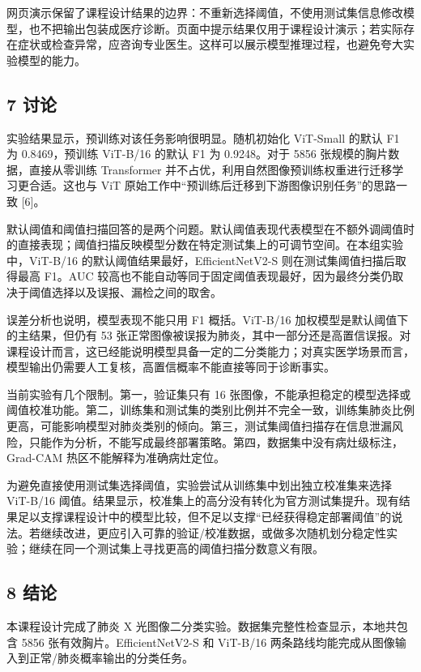 \documentclass[
]{ctexart}
\begin{document}
网页演示保留了课程设计结果的边界：不重新选择阈值，不使用测试集信息修改模型，也不把输出包装成医疗诊断。页面中提示结果仅用于课程设计演示；若实际存在症状或检查异常，应咨询专业医生。这样可以展示模型推理过程，也避免夸大实验模型的能力。

\hypertarget{ux8ba8ux8bba}{%
\subsection{7 讨论}\label{ux8ba8ux8bba}}

实验结果显示，预训练对该任务影响很明显。随机初始化 ViT-Small 的默认 F1
为 0.8469，预训练 ViT-B/16 的默认 F1 为 0.9248。对于 5856
张规模的胸片数据，直接从零训练 Transformer
并不占优，利用自然图像预训练权重进行迁移学习更合适。这也与 ViT
原始工作中``预训练后迁移到下游图像识别任务''的思路一致 {[}6{]}。

默认阈值和阈值扫描回答的是两个问题。默认阈值表现代表模型在不额外调阈值时的直接表现；阈值扫描反映模型分数在特定测试集上的可调节空间。在本组实验中，ViT-B/16
的默认阈值结果最好，EfficientNetV2-S 则在测试集阈值扫描后取得最高
F1。AUC
较高也不能自动等同于固定阈值表现最好，因为最终分类仍取决于阈值选择以及误报、漏检之间的取舍。

误差分析也说明，模型表现不能只用 F1 概括。ViT-B/16
加权模型是默认阈值下的主结果，但仍有 53
张正常图像被误报为肺炎，其中一部分还是高置信误报。对课程设计而言，这已经能说明模型具备一定的二分类能力；对真实医学场景而言，模型输出仍需要人工复核，高置信概率不能直接等同于诊断事实。

当前实验有几个限制。第一，验证集只有 16
张图像，不能承担稳定的模型选择或阈值校准功能。第二，训练集和测试集的类别比例并不完全一致，训练集肺炎比例更高，可能影响模型对肺炎类别的倾向。第三，测试集阈值扫描存在信息泄漏风险，只能作为分析，不能写成最终部署策略。第四，数据集中没有病灶级标注，Grad-CAM
热区不能解释为准确病灶定位。

为避免直接使用测试集选择阈值，实验尝试从训练集中划出独立校准集来选择
ViT-B/16
阈值。结果显示，校准集上的高分没有转化为官方测试集提升。现有结果足以支撑课程设计中的模型比较，但不足以支撑``已经获得稳定部署阈值''的说法。若继续改进，更应引入可靠的验证/校准数据，或做多次随机划分稳定性实验；继续在同一个测试集上寻找更高的阈值扫描分数意义有限。

\hypertarget{ux7ed3ux8bba}{%
\subsection{8 结论}\label{ux7ed3ux8bba}}

本课程设计完成了肺炎 X
光图像二分类实验。数据集完整性检查显示，本地共包含 5856
张有效胸片。EfficientNetV2-S 和 ViT-B/16
两条路线均能完成从图像输入到正常/肺炎概率输出的分类任务。
\end{document}
